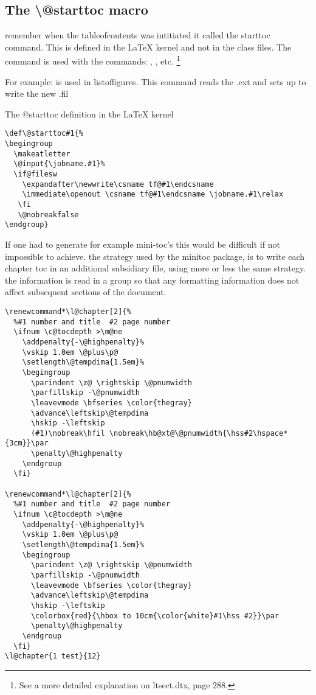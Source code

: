 \subsection{The \textbackslash @starttoc macro}

remember when the tableofcontents was intitiated it called the starttoc command. This is defined in the LaTeX kernel and not in the class files. The  command is used with the commands:
, , etc. \footnote{See a more detailed explanation on ltsect.dtx, page 288.}

For example:  is used in listoffigures. This command
reads the .ext and sets up to write the new .fil

\begin{tcolorbox}{The @starttoc definition in the LaTeX kernel}
\begin{lstlisting}
\def\@starttoc#1{%
\begingroup
  \makeatletter
  \@input{\jobname.#1}%
  \if@filesw
    \expandafter\newwrite\csname tf@#1\endcsname
    \immediate\openout \csname tf@#1\endcsname \jobname.#1\relax
   \fi
   \@nobreakfalse
\endgroup}
\end{lstlisting}
\end{tcolorbox}

If one had to generate for example mini-toc's this would be difficult if not impossible to achieve. the strategy used by the minitoc package, is to write each chapter toc in an additional subsidiary file, using more or less the same strategy. the information is read in a group so that any formatting information does not affect subsequent sections of the document.

\begin{tcolorbox}
\begin{lstlisting}
\renewcommand*\l@chapter[2]{%
  %#1 number and title  #2 page number
  \ifnum \c@tocdepth >\m@ne
    \addpenalty{-\@highpenalty}%
    \vskip 1.0em \@plus\p@
    \setlength\@tempdima{1.5em}%
    \begingroup
      \parindent \z@ \rightskip \@pnumwidth
      \parfillskip -\@pnumwidth
      \leavevmode \bfseries \color{thegray}
      \advance\leftskip\@tempdima
      \hskip -\leftskip
      (#1)\nobreak\hfil \nobreak\hb@xt@\@pnumwidth{\hss#2\hspace*{3cm}}\par
      \penalty\@highpenalty
    \endgroup
  \fi}

\renewcommand*\l@chapter[2]{%
  %#1 number and title  #2 page number
  \ifnum \c@tocdepth >\m@ne
    \addpenalty{-\@highpenalty}%
    \vskip 1.0em \@plus\p@
    \setlength\@tempdima{1.5em}%
    \begingroup
      \parindent \z@ \rightskip \@pnumwidth
      \parfillskip -\@pnumwidth
      \leavevmode \bfseries \color{thegray}
      \advance\leftskip\@tempdima
      \hskip -\leftskip
      \colorbox{red}{\hbox to 10cm{\color{white}#1\hss #2}}\par
      \penalty\@highpenalty
    \endgroup
  \fi}
\l@chapter{1 test}{12}
\end{lstlisting}
\end{tcolorbox}


